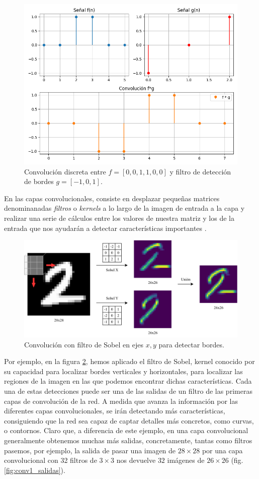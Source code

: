 \begin{figure}[ht]
	\centering
	\includegraphics[width=0.7\linewidth]{figures/ejemplos/convolucion_f_g_discretas.png}
	\caption{Convolución discreta entre $f = [0,0,1,1,0,0]$ y filtro de detección de bordes $g = [-1,0,1]$.}
	\label{fig:convolucion_f_g_discreta}
\end{figure}

En las capas convolucionales, consiste en desplazar pequeñas matrices denominanadas \textit{filtros} o \textit{kernels} a lo largo de la imagen de entrada a la capa y realizar una serie de cálculos entre los valores de nuestra matriz y los de la entrada que nos ayudarán a detectar características importantes \cite{nn_dl__michael_nielsen_2015}.

\begin{figure}[ht]
	\centering
	\includegraphics[width=1\linewidth]{figures/ejemplos/convolucion_sobel.png}
	\caption{Convolución con filtro de Sobel en ejes ${x,y}$ para detectar bordes.}
	\label{fig:convolucion_sobel}
\end{figure}

Por ejemplo, en la figura \ref{fig:convolucion_sobel}, hemos aplicado el filtro de Sobel, kernel conocido por su capacidad para localizar bordes verticales y horizontales, para localizar las regiones de la imagen en las que podemos encontrar dichas características. Cada una de estas detecciones puede ser una de las salidas de un filtro de las primeras capas de convolución de la red. A medida que avanza la información por las diferentes capas convolucionales, se irán detectando más características, consiguiendo que la red sea capaz de captar detalles más concretos, como curvas, o contornos. Claro que, a diferencia de este ejemplo, en una capa convolucional generalmente obtenemos muchas más salidas, concretamente, tantas como filtros pasemos, por ejemplo, la salida de pasar una imagen de $28\times28$ por una capa convolucional con 32 filtros de $3\times3$ nos devuelve $32$ imágenes de $26\times26$ (fig. \ref{fig:conv1_salidas}).

